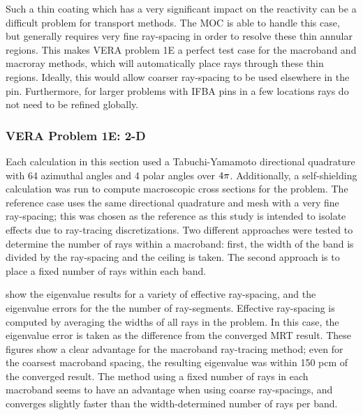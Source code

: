 {{{      Such a thin coating which has a very significant impact on the reactivity can be a difficult problem for transport methods.
      The \ac{MOC} is able to handle this case, but generally requires very fine ray-spacing in order to resolve these thin annular regions.
      This makes \ac{VERA} problem 1E a perfect test case for the macroband and macroray methods, which will automatically place rays through these thin regions.
      Ideally, this would allow coarser ray-spacing to be used elsewhere in the pin.
      Furthermore, for larger problems with \ac{IFBA} pins in a few locations rays do not need to be refined globally.

      \subsubsection{VERA Problem 1E: 2-D}{\label{sssec:MR:1E:2-D}
        Each calculation in this section used a Tabuchi-Yamamoto \cite{TabuchiYamamotoQuad} directional quadrature with 64 azimuthal angles and 4 polar angles over $4\pi$.
        Additionally, a self-shielding calculation was run to compute macroscopic cross sections for the problem.
        The reference case uses the same directional quadrature and mesh with a very fine ray-spacing; this was chosen as the reference as this study is intended to isolate effects due to ray-tracing discretizations.
        Two different approaches were tested to determine the number of rays within a macroband: first, the width of the band is divided by the ray-spacing and the ceiling is taken.
        The second approach is to place a fixed number of rays within each band.

         show the eigenvalue results for a variety of effective ray-spacing, and the eigenvalue errors for the the number of ray-segments.
        Effective ray-spacing is computed by averaging the widths of all rays in the problem.
        In this case, the eigenvalue error is taken as the difference from the converged \ac{MRT} result.
        These figures show a clear advantage for the macroband ray-tracing method;
          even for the coarsest macroband spacing, the resulting eigenvalue was within 150 pcm of the converged result.
        The method using a fixed number of rays in each macroband seems to have an advantage when using coarse ray-spacings, and converges slightly faster than the width-determined number of rays per band.

}}}}
